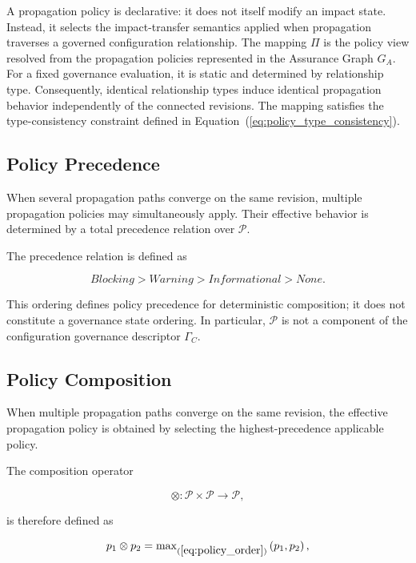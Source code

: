 \documentclass[10pt]{article}
\begin{document}
A propagation policy is declarative: it does not itself modify an impact state. Instead, it selects the impact-transfer semantics applied when propagation traverses a governed configuration relationship.
The mapping $\Pi$ is the policy view resolved from the propagation policies represented in the Assurance Graph $G_A$. For a fixed governance evaluation, it is static and determined by relationship type. Consequently, identical relationship types induce identical propagation behavior independently of the connected revisions. The mapping satisfies the type-consistency constraint defined in Equation~(\ref{eq:policy_type_consistency}).

\subsection{Policy Precedence}

When several propagation paths converge on the same revision, multiple propagation policies may simultaneously apply. Their effective behavior is determined by a total precedence relation over $\mathcal{P}$.

The precedence relation is defined as

\begin{equation}
	\textit{Blocking}
	>
	\textit{Warning}
	>
	\textit{Informational}
	>
	\textit{None}.
	\label{eq:policy_order}
\end{equation}

This ordering defines policy precedence for deterministic composition; it does not constitute a governance state ordering. In particular, $\mathcal P$ is not a component of the configuration governance descriptor $\Gamma_C$.

\subsection{Policy Composition}

When multiple propagation paths converge on the same revision, the effective
propagation policy is obtained by selecting the highest-precedence applicable
policy.

The composition operator

\begin{equation}
	\otimes :
	\mathcal{P}\times\mathcal{P}
	\rightarrow
	\mathcal{P},
	\label{eq:policy_composition}
\end{equation}

is therefore defined as

\begin{equation}
	p_1\otimes p_2
	=
	\max\nolimits_{(\ref{eq:policy_order})}
	\left(p_1,p_2\right),
	\label{eq:policy_max}
\end{equation}
\end{document}

